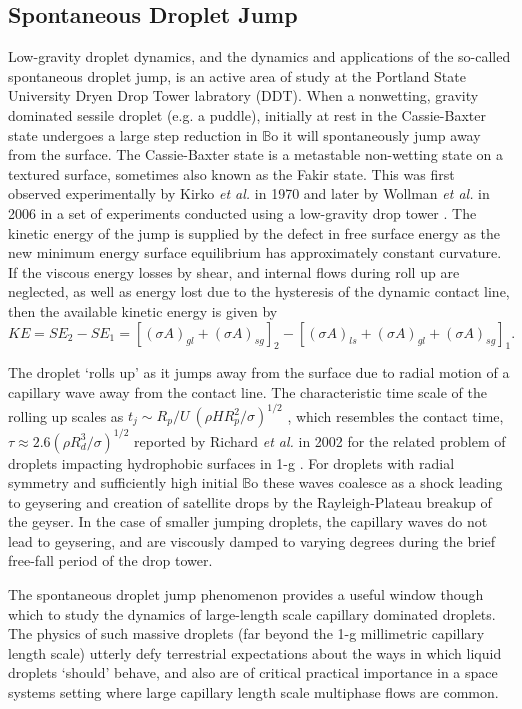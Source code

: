 \documentclass[10pt,a4paper]{article}
\begin{document}
\subsection{Spontaneous Droplet Jump}
Low-gravity droplet dynamics, and the dynamics and applications of the so-called spontaneous droplet jump, is an active area of study at the Portland State University Dryen Drop Tower labratory (DDT). When a nonwetting, gravity dominated sessile droplet (e.g. a puddle), initially at rest in the Cassie-Baxter state undergoes a large step reduction in $\mathbb{B}\mbox{o}$ it will spontaneously jump away from the surface. The Cassie-Baxter state is a metastable non-wetting state on a textured surface, sometimes also known as the Fakir state. This was first observed experimentally by Kirko \emph{et al.} \cite{kirko_phenomenon_1970} in 1970 and later by Wollman \emph{et al.} in 2006 in a set of experiments conducted using a low-gravity drop tower \cite{wollman_more_2016}. The kinetic energy of the jump is supplied by the defect in free surface energy as the new minimum energy surface equilibrium has approximately constant curvature. If the viscous energy losses by shear, and internal flows during roll up are neglected, as well as energy lost due to the hysteresis of the dynamic contact line, then the available kinetic energy is given by
\[KE = SE_2 -SE_1 = [(\sigma A)_{gl} + (\sigma A)_{sg}]_2 - [(\sigma A)_{ls} + (\sigma A)_{gl} + (\sigma A)_{sg}]_1. \]

The droplet `rolls up' as it jumps away from the surface due to radial motion of a capillary wave away from the contact line. The characteristic time scale of the rolling up scales as $t_j \sim R_p/U ~(\rho H R^2_p/\sigma)^{1/2}$ \cite{attari_puddle_2016}, which resembles the contact time, $\tau \approx 2.6(\rho R^3_d/\sigma)^{1/2}$ reported by Richard \emph{et al.} in 2002 for the related problem of droplets impacting hydrophobic surfaces in 1-g \cite{richard_surface_2002}. For droplets with radial symmetry and sufficiently high initial $\mathbb{B}\mbox{o}$ these waves coalesce as a shock leading to geysering and creation of satellite drops by the Rayleigh-Plateau breakup of the geyser. In the case of smaller jumping droplets, the capillary waves do not lead to geysering, and are viscously damped to varying degrees during the brief free-fall period of the drop tower.

The spontaneous droplet jump phenomenon provides a useful window though which to study the dynamics of large-length scale capillary dominated droplets. The physics of such massive droplets (far beyond the 1-g millimetric capillary length scale) utterly defy terrestrial expectations about the ways in which liquid droplets `should' behave, and also are of critical practical importance in a space systems setting where large capillary length scale multiphase flows are common.
\end{document}
